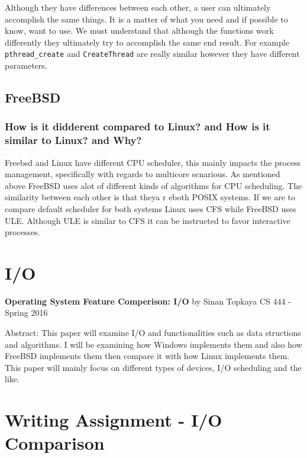 \documentclass[letterpaper,10pt,draftclsnofoot,onecolumn]{IEEEtran}
\begin{document}
Although they have differences between each other, a user can ultimately accomplish the same things. It is a matter of what you need and if possible to know, want to use. We must understand that although the functions work differently they ultimately try to accomplish the same end result. For example \verb|pthread_create| and \verb|CreateThread| are really similar however they have different parameters.

\subsection*{FreeBSD}
\subsubsection*{How is it didderent compared to Linux? and How is it similar to Linux? and Why?}

Freebsd and Linux have different CPU scheduler, this mainly impacts the process management, specifically with regards to multicore scnarious. As mentioned above FreeBSD uses alot of different kinds of algorithms for CPU scheduling. The similarity between each other is that theya r eboth POSIX systems. If we are to compare default scheduler for both systems Linux uses CFS while FreeBSD uses ULE. Although ULE is similar to CFS it can be instructed to favor interactive processes.

\newpage
\section{I/O}\label{AppendixB}

\begin{titlepage}
		
		\begin{center}
		\bigbreak	
		\textbf{Operating System Feature Comperison: I/O}
		\bigbreak
		by Sinan Topkaya
		\smallbreak
		CS 444 - Spring 2016
		\end{center}
		\vfill
		
		Abstract: This paper will examine I/O and functionalities such as data structions and algorithms. I will be examining how Windows implements them and also how FreeBSD implements them then compare it with how Linux implements them. This paper will mainly focus on different types of devices, I/O scheduling and the like.
		
	\end{titlepage}

\section*{Writing Assignment - I/O Comparison}
\end{document}

